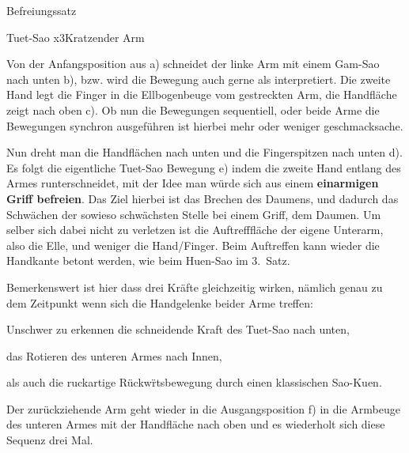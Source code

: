 
\begin{WTSatz}{Befreiungssatz}%

	
	\begin{WTSatzTeil}{Tuet-Sao x3}{Kratzender Arm}
		
		
		Von der Anfangsposition aus a) schneidet der linke Arm mit einem Gam-Sao nach unten b), bzw. wird die Bewegung auch gerne als  interpretiert. Die zweite Hand legt die Finger in die Ellbogenbeuge vom gestreckten Arm, die Handfl\"ache zeigt nach oben c). Ob nun die Bewegungen sequentiell, oder beide Arme die Bewegungen synchron ausgef\"uhren ist hierbei mehr oder weniger geschmacksache.
				
		
		Nun dreht man die Handfl\"achen nach unten und die Fingerspitzen nach unten d). Es folgt die eigentliche Tuet-Sao Bewegung e) indem die zweite Hand entlang des Armes runterschneidet, mit der Idee man w\"urde sich aus einem \textbf{einarmigen Griff befreien}. Das Ziel hierbei ist das Brechen des Daumens, und dadurch das Schw\"achen der sowieso schw\"achsten Stelle bei einem Griff, dem Daumen. Um selber sich dabei nicht zu verletzen ist die Auftrefffl\"ache der eigene Unterarm, also die Elle, und weniger die Hand/Finger. Beim Auftreffen kann wieder die Handkante betont werden, wie beim Huen-Sao im 3.~Satz.
		
		Bemerkenswert ist hier dass drei Kr\"afte gleichzeitig wirken, n\"amlich genau zu dem Zeitpunkt wenn sich die Handgelenke beider Arme treffen:
		\begin{enumerateNarrow}
			\item Unschwer zu erkennen die schneidende Kraft des Tuet-Sao nach unten,
			\item das Rotieren des unteren Armes nach Innen,
			\item als auch die ruckartige R\"uckw\"rtsbewegung durch einen klassischen Sao-Kuen.
		\end{enumerateNarrow}
		
		Der zur\"uckziehende Arm geht wieder in die Ausgangsposition f) in die Armbeuge des unteren Armes mit der Handfl\"ache nach oben und es wiederholt sich diese Sequenz drei Mal.


\end{WTSatzTeil}
\end{WTSatz}

